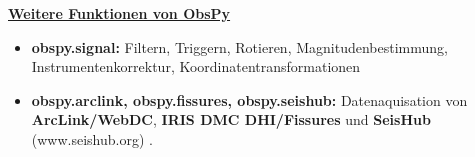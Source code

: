 \documentclass[final]{lmuposter}
\begin{document}
\begin{multicols}{2}
{\underline{\textbf{Weitere Funktionen von ObsPy}}
\begin{itemize}
\item \textbf{obspy.signal:} Filtern, Triggern, Rotieren, Magnitudenbestimmung, Instrumentenkorrektur, Koordinatentransformationen
\item \textbf{obspy.arclink, obspy.fissures, obspy.seishub:} Datenaquisation von \textbf{ArcLink/WebDC}, \textbf{IRIS DMC DHI/Fissures} und \textbf{SeisHub} (www.seishub.org) \citep{seishub}.
\end{itemize}

}\vspace{\MyBoxVSep}

%
%
\vspace{\MyBoxVSep}

\end{multicols}
\vspace{-0.60cm}
\vspace{\MyBoxVSep}
\end{document}
